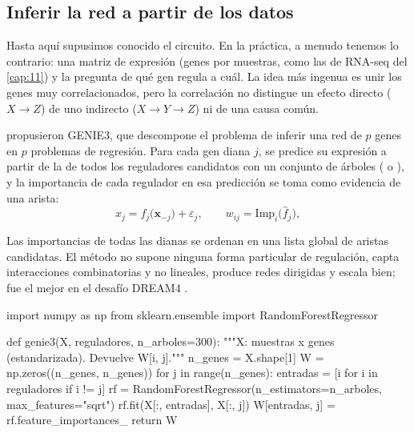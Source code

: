 \subsection{Inferir la red a partir de los datos}

Hasta aquí supusimos conocido el circuito. En la práctica, a menudo tenemos lo contrario: una matriz de expresión (genes por muestras, como las de RNA-seq del \cref{cap:11}) y la pregunta de qué gen regula a cuál. La idea más ingenua es unir los genes muy correlacionados, pero la correlación no distingue un efecto directo ($X\to Z$) de uno indirecto ($X\to Y\to Z$) ni de una causa común.

\textcite{c16-huynhthu2010} propusieron GENIE3, que descompone el problema de inferir una red de $p$ genes en $p$ problemas de regresión. Para cada gen diana $j$, se predice su expresión a partir de la de todos los reguladores candidatos con un conjunto de árboles ( o ), y la importancia de cada regulador en esa predicción se toma como evidencia de una arista:
\begin{equation}\label{eq:16-genie3}
x_j = f_j\big(\mathbf{x}_{-j}\big)+\varepsilon_j,\qquad
w_{ij}=\mathrm{Imp}_i\big(\hat f_j\big),
\end{equation}
\begin{simbolos}
\end{simbolos}
Las importancias de todas las dianas se ordenan en una lista global de aristas candidatas. El método no supone ninguna forma particular de regulación, capta interacciones combinatorias y no lineales, produce redes dirigidas y escala bien; fue el mejor en el desafío DREAM4 .

\begin{codigo}[genie3.py]
import numpy as np
from sklearn.ensemble import RandomForestRegressor

def genie3(X, reguladores, n_arboles=300):
    """X: muestras x genes (estandarizada). Devuelve W[i, j]."""
    n_genes = X.shape[1]
    W = np.zeros((n_genes, n_genes))
    for j in range(n_genes):
        entradas = [i for i in reguladores if i != j]
        rf = RandomForestRegressor(n_estimators=n_arboles,
                                   max_features="sqrt")
        rf.fit(X[:, entradas], X[:, j])
        W[entradas, j] = rf.feature_importances_
    return W
\end{codigo}

